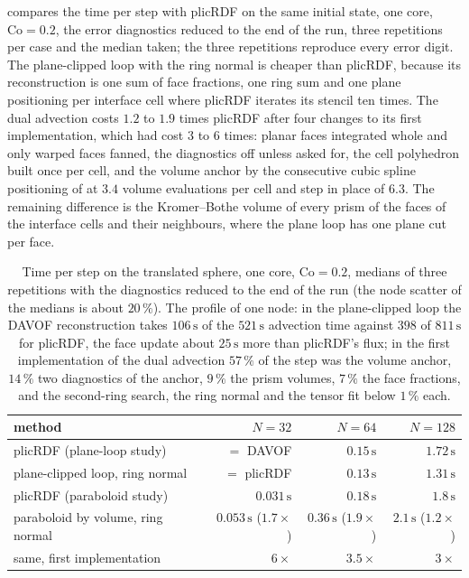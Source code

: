  compares the time per step with plicRDF on the same initial state, one core, $\mathrm{Co} = 0.2$, the error diagnostics reduced to the end of the run, three repetitions per case and the median taken; the three repetitions reproduce every error digit. The plane-clipped loop with the ring normal is cheaper than plicRDF, because its reconstruction is one sum of face fractions, one ring sum and one plane positioning per interface cell where plicRDF iterates its stencil ten times. The dual advection costs $1.2$ to $1.9$ times plicRDF after four changes to its first implementation, which had cost $3$ to $6$ times: planar faces integrated whole and only warped faces fanned, the diagnostics off unless asked for, the cell polyhedron built once per cell, and the volume anchor by the consecutive cubic spline positioning of \citet{Maric2021CCS} at $3.4$ volume evaluations per cell and step in place of $6.3$. The remaining difference is the Kromer--Bothe volume of every prism of the faces of the interface cells and their neighbours, where the plane loop has one plane cut per face.

\begin{table}[htbp]
\centering
\caption{Time per step on the translated sphere, one core, $\mathrm{Co} = 0.2$, medians of three repetitions with the diagnostics reduced to the end of the run (the node scatter of the medians is about $20\,\%$). The profile of one node: in the plane-clipped loop the DAVOF reconstruction takes $106\,\mathrm{s}$ of the $521\,\mathrm{s}$ advection time against $398$ of $811\,\mathrm{s}$ for plicRDF, the face update about $25\,\mathrm{s}$ more than plicRDF's flux; in the first implementation of the dual advection $57\,\%$ of the step was the volume anchor, $14\,\%$ two diagnostics of the anchor, $9\,\%$ the prism volumes, $7\,\%$ the face fractions, and the second-ring search, the ring normal and the tensor fit below $1\,\%$ each.}
\label{tab:tpf-cost}
\footnotesize
\begin{tabular}{lrrr}
\toprule
method & $N = 32$ & $N = 64$ & $N = 128$ \\
\midrule
plicRDF (plane-loop study) & $=$ DAVOF & $0.15\,\mathrm{s}$ & $1.72\,\mathrm{s}$ \\
plane-clipped loop, ring normal & $=$ plicRDF & $0.13\,\mathrm{s}$ & $1.31\,\mathrm{s}$ \\
\midrule
plicRDF (paraboloid study) & $0.031\,\mathrm{s}$ & $0.18\,\mathrm{s}$ & $1.8\,\mathrm{s}$ \\
paraboloid by volume, ring normal & $0.053\,\mathrm{s}$ ($1.7\times$) & $0.36\,\mathrm{s}$ ($1.9\times$) & $2.1\,\mathrm{s}$ ($1.2\times$) \\
same, first implementation & $6\times$ & $3.5\times$ & $3\times$ \\
\bottomrule
\end{tabular}
\end{table}

